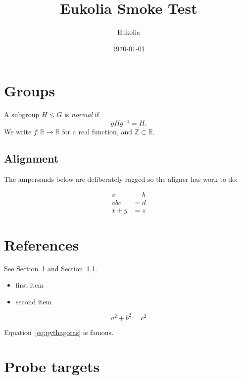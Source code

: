 \documentclass[11pt]{article}
\title{Eukolia Smoke Test}
\author{Eukolia}
\date{\today}
\newcommand{\R}{\mathbb{R}}
\newcommand{\Z}{\mathbb{Z}}
\begin{document}
\maketitle

\section{Groups}\label{sec:groups}

A subgroup \(H\leq G\) is \emph{normal} if
\[
  gHg^{-1}=H.
\]
We write \(f:\R\to\R\) for a real function, and \(\Z\subset\R\).

\subsection{Alignment}\label{sec:alignment}

The ampersands below are deliberately ragged so the aligner has work to do:

\begin{align}
a &= b \\
abc &= d \\
x+y &= z
\end{align}

\section{References}\label{sec:references}

See Section~\ref{sec:groups} and Section~\ref{sec:alignment}.

\begin{itemize}
  \item first item
  \item second item
\end{itemize}

\begin{equation}\label{eq:pythagoras}
  a^2 + b^2 = c^2
\end{equation}

Equation~\eqref{eq:pythagoras} is famous.

\section{Probe targets}\label{sec:probe}
\end{document}
